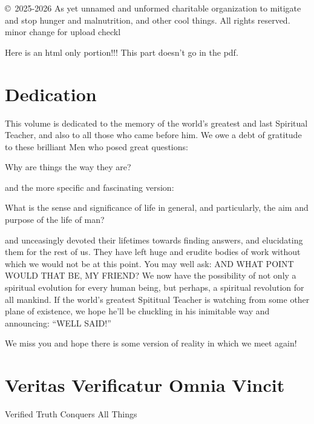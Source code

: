 \documentclass[12pt,letterpaper]{book}
\begin{document}


\copyright\ 2025-2026 As yet unnamed and unformed charitable organization to mitigate and stop hunger and malnutrition, and other cool things. All rights reserved. minor change for upload checkl

\begin{htmlonly}
  Here is an html only portion!!!
This part doesn't go in the pdf.
\end{htmlonly}

\tableofcontents

\chapter{Dedication}
This volume is dedicated to the memory of the world's greatest and last Spiritual Teacher, and also to all those who came before him. We owe a debt of gratitude to these brilliant Men who posed great questions:

Why are things the way they are?

and the more specific and fascinating version:

What is the sense and significance of life in general, and particularly, the aim and purpose of the life of man?

and unceasingly devoted their lifetimes towards finding answers, and elucidating them for the rest of us. They have left huge and erudite bodies of work without which we would not be at this point. You may well ask: AND WHAT POINT WOULD THAT BE, MY FRIEND? %
We now have the possibility of not only a spiritual evolution for every human being, but perhaps, a spiritual revolution for all mankind. If the world's greatest Spititual Teacher is watching from some other plane of existence, we hope he'll be chuckling in his inimitable way and announcing: ``WELL SAID!''

We miss you and hope there is some version of reality in which we meet again!

\chapter{Veritas Verificatur Omnia Vincit}
Verified Truth Conquers All Things
\end{document}
